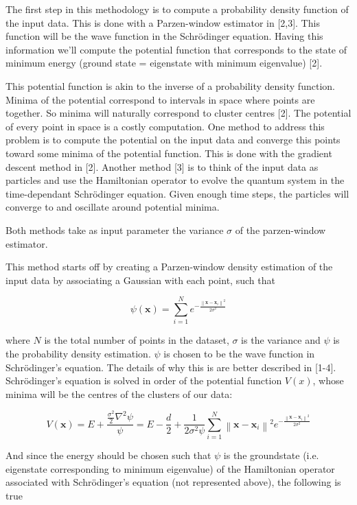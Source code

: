 \documentclass[10pt,a4paper,final]{article}
\begin{document}
The first step in this methodology is to compute a probability density function of the input data. This is done with a Parzen-window estimator in [2,3]. This function will be the wave function in the Schrödinger equation. Having this information we'll compute the potential function that corresponds to the state of minimum energy (ground state = eigenstate with minimum eigenvalue) [2].

This potential function is akin to the inverse of a probability density function. Minima of the potential correspond to intervals in space where points are together. So minima will naturally correspond to cluster centres [2]. The potential of every point in space is a costly computation. One method to address this problem is to compute the potential on the input data and converge this points toward some minima of the potential function. This is done with the gradient descent method in [2]. Another method [3] is to think of the input data as particles and use the Hamiltonian operator to evolve the quantum system in the time-dependant Schrödinger equation. Given enough time steps, the particles will converge to and oscillate around potential minima.

Both methods take as input parameter the variance $\sigma$ of the parzen-window estimator.

This method starts off by creating a Parzen-window density estimation of the input data by associating a Gaussian with each point, such that

$$ \psi (\mathbf{x}) = \sum ^N _{i=1} e^{- \frac{\left \| \mathbf{x}-\mathbf{x}_i \right \| ^2}{2 \sigma ^2}} $$

where $N$ is the total number of points in the dataset, $\sigma$ is the variance and $\psi$ is the probability density estimation. $\psi$ is chosen to be the wave function in Schrödinger's equation. The details of why this is are better described in [1-4]. Schrödinger's equation is solved in order of the potential function $V(x)$, whose minima will be the centres of the clusters of our data:      

$$
V(\mathbf{x}) = E + \frac {\frac{\sigma^2}{2}\nabla^2 \psi }{\psi} 
= E - \frac{d}{2} + \frac {1}{2 \sigma^2 \psi} \sum ^N _{i=1} \left \| \mathbf{x}-\mathbf{x}_i \right \| ^2 e^{- \frac{\left \| \mathbf{x}-\mathbf{x}_i \right \| ^2}{2 \sigma ^2}}
$$

And since the energy should be chosen such that $\psi$ is the groundstate (i.e. eigenstate corresponding to minimum eigenvalue) of the Hamiltonian operator associated with Schrödinger's equation (not represented above), the following is true
\end{document}
